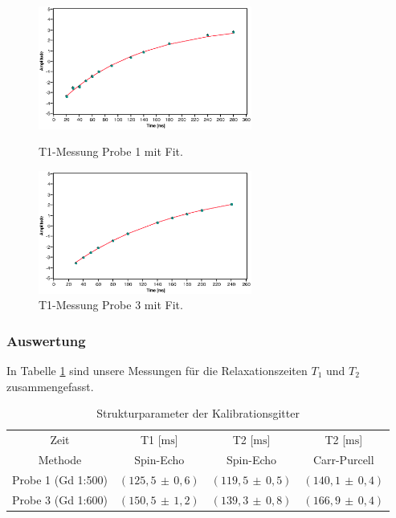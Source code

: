 \documentclass[a4paper]{scrartcl} %
\newcommand{\err}[2]{( #1 \, \pm \, #2 )} %
\begin{document}
\begin{figure}[H]
	\centering
	\parbox{70mm}{
		\centering
		\includegraphics[width=70mm]{./Resources/t1_meas_p1.eps}
		\caption{T1-Messung Probe 1 mit Fit.}
		\label{fig:t1_p1}
	}
	\hspace*{\fill}
	\parbox{70mm}{
		\centering
		\includegraphics[width=70mm]{./Resources/t1_meas_p3.eps}
		\caption{T1-Messung Probe 3 mit Fit.}
		\label{fig:t1_p3}
	}
\end{figure}

\subsubsection{Auswertung}

In Tabelle \ref{tab:relaxtimes} sind unsere Messungen für die Relaxationszeiten $T_1$ und $T_2$ zusammengefasst.

\begin{table}[H] 
	\centering
	\caption{Strukturparameter der Kalibrationsgitter}
	\label{tab:relaxtimes}
	\begin{tabular}{cccc}
		\toprule
		Zeit & T1 [$\mathrm{ms}$] & T2 [$\mathrm{ms}$] & T2 [$\mathrm{ms}$]\\
		Methode & Spin-Echo & Spin-Echo & Carr-Purcell\\
		\midrule
		Probe 1 (Gd 1:500)& $\err{125,5}{0,6}$ & $\err{119,5}{0,5}$ & $\err{140,1}{0,4}$\\
		Probe 3 (Gd 1:600)& $\err{150,5}{1,2}$ & $\err{139,3}{0,8}$ & $\err{166,9}{0,4}$\\
		\bottomrule
	\end{tabular}
\end{table}
\end{document}
